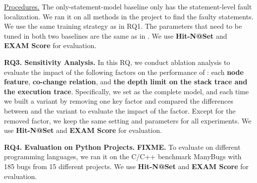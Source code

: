 
\underline{Procedures.}
The only-statement-model baseline only has the statement-level fault
localization. We ran it on all methods in the project to find the
faulty statements. We use the same training strategy as in RQ1.  The
parameters that need to be tuned in both two baselines are the same as
in {\tool}. We use \textbf{Hit-N@Set} and \textbf{EXAM Score} for
evaluation.

{\bf RQ3. Sensitivity Analysis.}  In this RQ, we conduct ablation
analysis to evaluate the impact of the following factors on the
performance of {\tool}: each {\bf node feature}, {\bf co-change
relation}, and {\bf the depth limit on the stack trace and the
execution trace}. Specifically, we set \tool as the complete model,
and each time we built a variant by removing one key factor and
compared the differences between {\tool} and the variant to evaluate
the impact of the factor. Except for the removed factor, we keep the
same setting and parameters for all experiments. We
use \textbf{Hit-N@Set} and \textbf{EXAM Score} for evaluation.

{\bf RQ4. Evaluation on Python Projects.}
%
{\bf FIXME.} To evaluate {\tool} on different programming languages, we ran it on
the C/C++ benchmark ManyBugs \cite{manybugs} with 185 bugs from 15
different projects. We use \textbf{Hit-N@Set} and \textbf{EXAM Score}
for evaluation.
